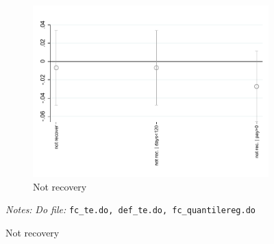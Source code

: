 \documentclass[11pt]{article}
\begin{document}
\begin{figure}[H]
\begin{center}
\begin{subfigure}{0.55\textwidth}
        \caption{Not recovery}
        \centering
        \includegraphics[width=\textwidth]{Figuras/def_te_pro_3.pdf}
    \end{subfigure}
    \end{center}
             \footnotesize \textit{Notes: } 
      \footnotesize{ } \textit{Do file: }  \texttt{fc\_te.do, def\_te.do, fc\_quantilereg.do}
\end{figure}
\end{document}
